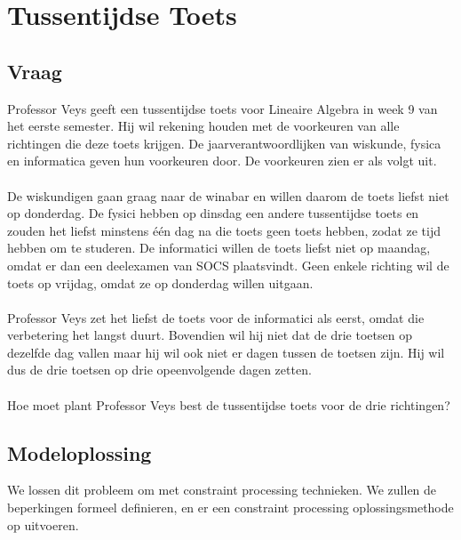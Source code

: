 \documentclass[alternative-exam.tex]{subfiles}
\begin{document}
\chapter{Tussentijdse Toets}

\section{Vraag}
Professor Veys geeft een tussentijdse toets voor Lineaire Algebra in week 9 van het eerste semester.
Hij wil rekening houden met de voorkeuren van alle richtingen die deze toets krijgen. De jaarverantwoordlijken van wiskunde, fysica en informatica geven hun voorkeuren door. De voorkeuren zien er als volgt uit.\\\\
De wiskundigen gaan graag naar de winabar en willen daarom de toets liefst niet op donderdag. De fysici hebben op dinsdag een andere tussentijdse toets en zouden het liefst minstens één dag na die toets geen toets hebben, zodat ze tijd hebben om te studeren. De informatici willen de toets liefst niet op maandag, omdat er dan een deelexamen van SOCS plaatsvindt. Geen enkele richting wil de toets op vrijdag, omdat ze op donderdag willen uitgaan.\\\\
Professor Veys zet het liefst de toets voor de informatici als eerst, omdat die verbetering het langst duurt. Bovendien wil hij niet dat de drie toetsen op dezelfde dag vallen maar hij wil ook niet er dagen tussen de toetsen zijn. Hij wil dus de drie toetsen op drie opeenvolgende dagen zetten.\\\\
Hoe moet plant Professor Veys best de tussentijdse toets voor de drie richtingen?

\section{Modeloplossing}
We lossen dit probleem om met constraint processing technieken. We zullen de beperkingen formeel definieren, en er een constraint processing oplossingsmethode op uitvoeren.
\end{document}

